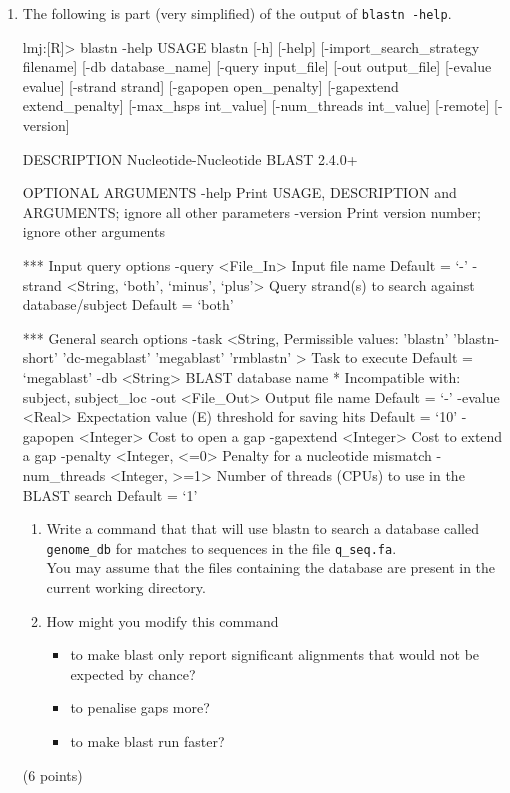 \documentclass[11pt]{article}
\begin{document}
\begin{enumerate}
\item The following is part (very simplified) of the output of \texttt{blastn -help}.\\
  \begin{consolecode}
lmj:[R]> blastn -help 
USAGE                                                                                                                                                 
  blastn [-h] [-help] [-import_search_strategy filename]                                                                                              
    [-db database_name] [-query input_file]                                                                            
    [-out output_file] [-evalue evalue] [-strand strand]
    [-gapopen open_penalty] [-gapextend extend_penalty]                                                                                               
    [-max_hsps int_value] [-num_threads int_value] [-remote]
    [-version]

DESCRIPTION
   Nucleotide-Nucleotide BLAST 2.4.0+

OPTIONAL ARGUMENTS
 -help
   Print USAGE, DESCRIPTION and ARGUMENTS; ignore all other parameters
 -version
   Print version number;  ignore other arguments

 *** Input query options
 -query <File_In>
   Input file name
   Default = `-'
 -strand <String, `both', `minus', `plus'>
   Query strand(s) to search against database/subject
   Default = `both'

 *** General search options
 -task <String, Permissible values: 'blastn' 'blastn-short' 
           'dc-megablast' 'megablast' 'rmblastn' >
   Task to execute
   Default = `megablast'
 -db <String>
   BLAST database name
    * Incompatible with:  subject, subject_loc
 -out <File_Out>
   Output file name
   Default = `-'
 -evalue <Real>
   Expectation value (E) threshold for saving hits 
   Default = `10'
 -gapopen <Integer>
   Cost to open a gap
 -gapextend <Integer>
   Cost to extend a gap
 -penalty <Integer, <=0>
   Penalty for a nucleotide mismatch
 -num_threads <Integer, >=1>
   Number of threads (CPUs) to use in the BLAST search
   Default = `1'
  \end{consolecode}

  \begin{enumerate}
  \item 
    Write a command that that will use blastn to search a database called
    \texttt{genome\_db} for matches to sequences in the file \texttt{q\_seq.fa}.\\
    You may assume that the files containing the database are present in the
    current working directory.
  \item How might you modify this command 
    \begin{itemize}
      \item to make blast only report significant alignments that would not be
        expected by chance?
      \item to penalise gaps more?
      \item to make blast run faster?
    \end{itemize}
  \end{enumerate}
  (6 points)
  

\end{enumerate}
\end{document}
